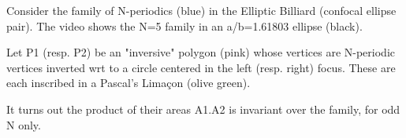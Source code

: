 Consider the family of N-periodics (blue) in the Elliptic Billiard (confocal ellipse pair). The video shows the N=5 family in an a/b=1.61803 ellipse (black).

Let P1 (resp. P2) be an "inversive" polygon (pink) whose vertices are N-periodic vertices inverted wrt to a circle centered in the left (resp. right) focus. These are each inscribed in a Pascal's Limaçon (olive green).

It turns out the product of their areas A1.A2 is invariant over the family, for odd N only.